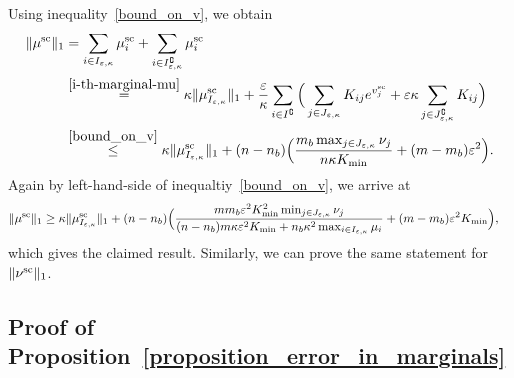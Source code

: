 Using inequality~\eqref{bound_on_v}, we obtain 
\begin{align*}
\|\mu^{\text{sc}}\|_1 &= \sum_{i \in I_{\varepsilon,\kappa}} \mu^{\text{sc}}_i +  \sum_{i \in I^\complement_{\varepsilon,\kappa}}\mu^{\text{sc}}_i\\
& \overset{\eqref{i-th-marginal-mu}}{=} \kappa \|\mu_{I_{\varepsilon,\kappa}}^{\text{sc}}\|_1 + \frac \varepsilon\kappa \sum_{i \in I^\complement}\Big( \sum_{j \in J_{\varepsilon,\kappa}} K_{ij} e^{v^{\text{sc}}_j} + \varepsilon\kappa \sum_{j\in J^\complement_{\varepsilon,\kappa}}K_{ij}\Big)\\
& \overset{\eqref{bound_on_v}}{\leq} \kappa \|\mu_{I_{\varepsilon,\kappa}}^{\text{sc}}\|_1 + (n-n_b) \Big(\frac{m_b\max_{j \in J_{\varepsilon,\kappa}} \nu_j}{n\kappa K_{\min}} + (m-m_b)\varepsilon^2 \Big).
\end{align*}
Again by left-hand-side of inequaltiy~\eqref{bound_on_v}, we arrive at 
\begin{align*}
\norm{\mu^{\text{sc}}}_1 %
& \overset{}{\geq} \kappa \norm{\mu_{I_{\varepsilon,\kappa}}^{\text{sc}}}_1 + (n -n_b) \Big(\frac{mm_b\varepsilon^2 K_{\min}^2 \min_{j\in J_{\varepsilon, \kappa}} \nu_j}{ (n-n_b)m\kappa \varepsilon^2 K_{\min} + n_b\kappa^2 \max_{i\in I_{\varepsilon,\kappa}}\mu_i }+ (m-m_b)\varepsilon^2K_{\min}\Big),
\end{align*}
which gives the claimed result.
Similarly, we can prove the same statement for $\|\nu^{\text{sc}}\|_1$.

\subsection{Proof of Proposition~\ref{proposition_error_in_marginals}}

